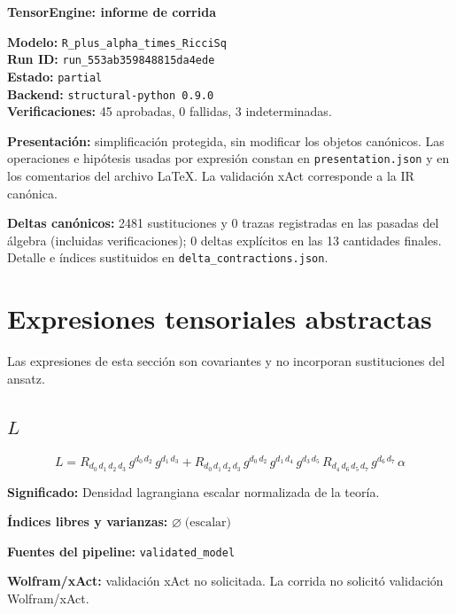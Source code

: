 \documentclass[11pt]{article}
\begin{document}
\begin{center}
{\Large\bfseries TensorEngine: informe de corrida}
\end{center}
\textbf{Modelo:} \texttt{R\_plus\_alpha\_times\_RicciSq}\\
\textbf{Run ID:} \texttt{run\_553ab359848815da4ede}\\
\textbf{Estado:} \texttt{partial}\\
\textbf{Backend:} \texttt{structural-python 0.9.0}\\
\textbf{Verificaciones:} 45 aprobadas, 0 fallidas, 3 indeterminadas.
\par\smallskip
\textbf{Presentación:} simplificación protegida, sin modificar los objetos canónicos. Las operaciones e hipótesis usadas por expresión constan en \texttt{presentation.json} y en los comentarios del archivo LaTeX. La validación xAct corresponde a la IR canónica.\par
\textbf{Deltas canónicos:} 2481 sustituciones y 0 trazas registradas en las pasadas del álgebra (incluidas verificaciones); 0 deltas explícitos en las 13 cantidades finales. Detalle e índices sustituidos en \texttt{delta\_contractions.json}.\par
\section*{Expresiones tensoriales abstractas}
Las expresiones de esta sección son covariantes y no incorporan sustituciones del ansatz.
\subsection*{$ L $}
\begin{dmath*}[breakdepth={5}]
L = R{}_{d_{0}\,d_{1}\,d_{2}\,d_{3}}\,g{}^{d_{0}\,d_{2}}\,g{}^{d_{1}\,d_{3}} + R{}_{d_{0}\,d_{1}\,d_{2}\,d_{3}}\,g{}^{d_{0}\,d_{2}}\,g{}^{d_{1}\,d_{4}}\,g{}^{d_{3}\,d_{5}}\,R{}_{d_{4}\,d_{6}\,d_{5}\,d_{7}}\,g{}^{d_{6}\,d_{7}}\,\alpha
\end{dmath*}
\par\vspace{1.2\baselineskip}\noindent
\begin{minipage}{\linewidth}
\textbf{Significado:} Densidad lagrangiana escalar normalizada de la teoría.\par
\textbf{Índices libres y varianzas:} $ \varnothing\;\text{(escalar)} $\par
\textbf{Fuentes del pipeline:} \texttt{validated\_model}\par
\textbf{Wolfram/xAct:} validación xAct no solicitada. La corrida no solicitó validación Wolfram/xAct.\par
\end{minipage}
\end{document}
